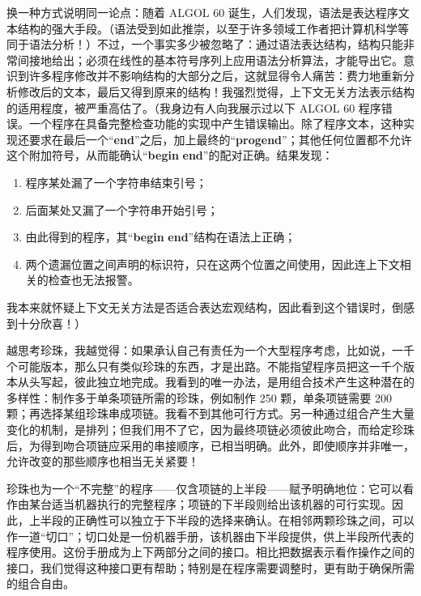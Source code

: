 换一种方式说明同一论点：随着 ALGOL 60 诞生，人们发现，语法是表达程序文本结构的强大手段。（语法受到如此推崇，以至于许多领域工作者把计算机科学等同于语法分析！）不过，一个事实多少被忽略了：通过语法表达结构，结构只能非常间接地给出；必须在线性的基本符号序列上应用语法分析算法，才能导出它。意识到许多程序修改并不影响结构的大部分之后，这就显得令人痛苦：费力地重新分析修改后的文本，最后又得到原来的结构！我强烈觉得，上下文无关方法表示结构的适用程度，被严重高估了。（我身边有人向我展示过以下 ALGOL 60 程序错误。一个程序在具备完整检查功能的实现中产生错误输出。除了程序文本，这种实现还要求在最后一个“\textbf{end}”之后，加上最终的“\textbf{progend}”；其他任何位置都不允许这个附加符号，从而能确认“\textbf{begin} \textendash  \textbf{end}”的配对正确。结果发现：

\begin{enumerate}[wide, nosep, label=(\arabic*)]
	\item 程序某处漏了一个字符串结束引号；
	
	\item 后面某处又漏了一个字符串开始引号；
	
	\item 由此得到的程序，其“\textbf{begin} \textendash  \textbf{end}”结构在语法上正确；
	
	\item 两个遗漏位置之间声明的标识符，只在这两个位置之间使用，因此连上下文相关的检查也无法报警。
\end{enumerate}

\noindent
我本来就怀疑上下文无关方法是否适合表达宏观结构，因此看到这个错误时，倒感到十分欣喜！）

越思考珍珠，我越觉得：如果承认自己有责任为一个大型程序考虑，比如说，一千个可能版本，那么只有类似珍珠的东西，才是出路。不能指望程序员把这一千个版本从头写起，彼此独立地完成。我看到的唯一办法，是用组合技术产生这种潜在的多样性：制作多于单条项链所需的珍珠，例如制作 250 颗，单条项链需要 200 颗；再选择某组珍珠串成项链。我看不到其他可行方式。另一种通过组合产生大量变化的机制，是排列；但我们用不了它，因为最终项链必须彼此吻合，而给定珍珠后，为得到吻合项链应采用的串接顺序，已相当明确。此外，即使顺序并非唯一，允许改变的那些顺序也相当无关紧要！

珍珠也为一个“不完整”的程序——仅含项链的上半段——赋予明确地位：它可以看作由某台适当机器执行的完整程序；项链的下半段则给出该机器的可行实现。因此，上半段的正确性可以独立于下半段的选择来确认。在相邻两颗珍珠之间，可以作一道“切口”；切口处是一份机器手册，该机器由下半段提供，供上半段所代表的程序使用。这份手册成为上下两部分之间的接口。相比把数据表示看作操作之间的接口，我们觉得这种接口更有帮助；特别是在程序需要调整时，更有助于确保所需的组合自由。

